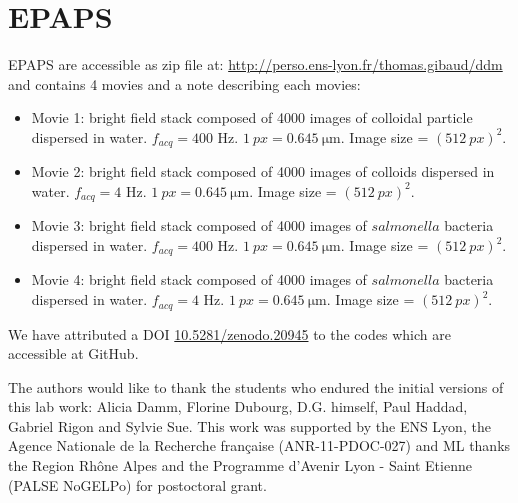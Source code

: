\documentclass[%
 aip,
 jmp,%
 amsmath,amssymb,
reprint,%
]{revtex4-1}
\begin{document}
\section*{\label{epaps}EPAPS}
EPAPS are accessible as zip file at: \url{http://perso.ens-lyon.fr/thomas.gibaud/ddm} and  contains 4 movies and a note describing each movies:
\begin{itemize}
 \item Movie 1: bright field stack composed of 4000 images of colloidal particle dispersed in water. $f_{acq}=400$ Hz. $\SI{1}{px} = \SI{0.645}{\micro\meter}$. Image size = $(\SI{512}{px})^2$.
 \item Movie 2: bright field stack composed of 4000 images of colloids dispersed in water. $f_{acq}=4$ Hz. $\SI{1}{px} = \SI{0.645}{\micro\meter}$. Image size = $(\SI{512}{px})^2$.
 \item Movie 3: bright field stack composed of 4000 images of $salmonella$ bacteria dispersed in water. $f_{acq}=400$ Hz. $\SI{1}{px} = \SI{0.645}{\micro\meter}$. Image size = $(\SI{512}{px})^2$.
 \item Movie 4: bright field stack composed of 4000 images of $salmonella$ bacteria dispersed in water. $f_{acq}=4$ Hz. $\SI{1}{px} = \SI{0.645}{\micro\meter}$. Image size = $(\SI{512}{px})^2$.
\end{itemize}

We have attributed a DOI \href{http://dx.doi.org/10.5281/zenodo.20945}{10.5281/zenodo.20945}\cite{code_github} to the codes which are accessible at GitHub.


\begin{acknowledgments}
The authors would like to thank the students who endured the initial versions of this lab work: Alicia Damm, Florine Dubourg, D.G. himself, Paul Haddad, Gabriel Rigon and Sylvie Sue. 
This work was supported by the ENS Lyon, the Agence Nationale de la Recherche fran\c{c}aise (ANR-11-PDOC-027) and ML thanks the Region Rh\^one Alpes and
the Programme d'Avenir Lyon - Saint Etienne (PALSE NoGELPo) for postoctoral grant.
\end{acknowledgments}



\end{document}
